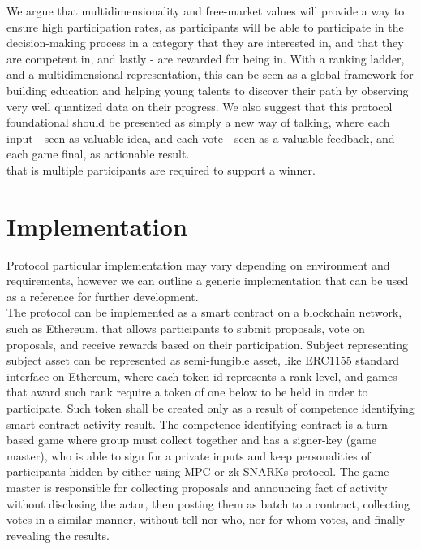 \documentclass{article}
\begin{document}
\begin{CJK}{UTF8}{gbsn}
\begin{multicols}{2}
We argue that multidimensionality and free-market values will provide a way to ensure high participation rates, as participants will be able to participate in the decision-making process in a category that they are interested in, and that they are competent in, and lastly - are rewarded for being in.
With a ranking ladder, and a multidimensional representation, this can be seen as a global framework for building education and helping young talents to discover their path by observing very well quantized data on their progress. We also suggest that this protocol foundational should be presented as simply a new way of talking, where each input - seen as valuable idea, and each vote - seen as a valuable feedback, and each game final, as actionable result.\\
that is multiple participants are required to support a winner.


\section{Implementation}
Protocol particular implementation may vary depending on environment and requirements, however we can outline a generic implementation that can be used as a reference for further development.\\
The protocol can be implemented as a smart contract on a blockchain network, such as Ethereum, that allows participants to submit proposals, vote on proposals, and receive rewards based on their participation. Subject representing subject asset can be represented as semi-fungible asset, like ERC1155\cite{EIP1155} standard interface on Ethereum, where each token id represents a rank level, and games that award such rank require a token of one below to be held in order to participate. Such token shall be created only as a result of competence identifying smart contract activity result. The competence identifying contract is a turn-based game where group must collect together and has a signer-key (game master), who is able to sign for a private inputs and keep personalities of participants hidden by either using MPC or zk-SNARKs protocol.
The game master is responsible for collecting proposals and announcing fact of activity without disclosing the actor, then posting them as batch to a contract, collecting votes in a similar manner, without tell nor who, nor for whom votes, and finally revealing the results.\\




\end{multicols}
\end{CJK}
\end{document}
